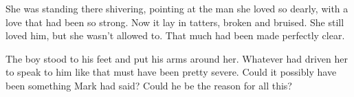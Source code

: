She was standing there shivering, pointing at the man she loved so dearly, with a love that had been so strong.  Now it lay in tatters, broken and bruised.  She still loved him, but she wasn't allowed to.  That much had been made perfectly clear.

The boy stood to his feet and put his arms around her.  Whatever had driven her to speak to him like that must have been pretty severe.  Could it possibly have been something Mark had said?  Could he be the reason for all this?







